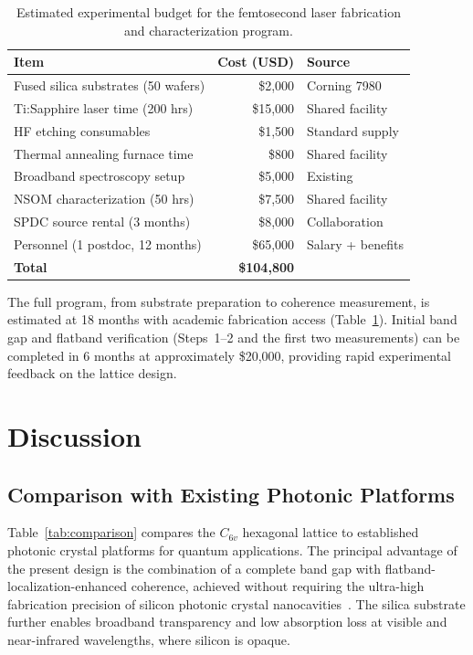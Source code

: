 \documentclass[10pt,letterpaper]{article}
\begin{document}
\begin{table}[h]
\centering
\caption{Estimated experimental budget for the femtosecond laser fabrication and characterization program.}
\label{tab:budget}
\begin{tabular}{lrl}
\toprule
\textbf{Item} & \textbf{Cost (USD)} & \textbf{Source} \\
\midrule
Fused silica substrates (50 wafers) & \$2,000 & Corning 7980 \\
Ti:Sapphire laser time (200 hrs) & \$15,000 & Shared facility \\
HF etching consumables & \$1,500 & Standard supply \\
Thermal annealing furnace time & \$800 & Shared facility \\
Broadband spectroscopy setup & \$5,000 & Existing \\
NSOM characterization (50 hrs) & \$7,500 & Shared facility \\
SPDC source rental (3 months) & \$8,000 & Collaboration \\
Personnel (1 postdoc, 12 months) & \$65,000 & Salary + benefits \\
\midrule
\textbf{Total} & \textbf{\$104,800} & \\
\bottomrule
\end{tabular}
\end{table}

The full program, from substrate preparation to coherence measurement, is estimated at 18 months with academic fabrication access (Table~\ref{tab:budget}). Initial band gap and flatband verification (Steps~1--2 and the first two measurements) can be completed in 6 months at approximately \$20,000, providing rapid experimental feedback on the lattice design.


\section{Discussion}
\label{sec:discussion}

\subsection{Comparison with Existing Photonic Platforms}

Table~\ref{tab:comparison} compares the $C_{6v}$ hexagonal lattice to established photonic crystal platforms for quantum applications. The principal advantage of the present design is the combination of a complete band gap with flatband-localization-enhanced coherence, achieved without requiring the ultra-high fabrication precision of silicon photonic crystal nanocavities~\cite{Akahane2003}. The silica substrate further enables broadband transparency and low absorption loss at visible and near-infrared wavelengths, where silicon is opaque.
\end{document}
